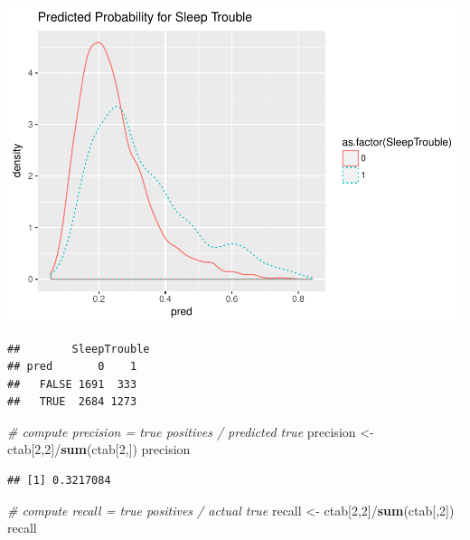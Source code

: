 \documentclass[]{article}
\newenvironment{Shaded}{\begin{snugshade}}{\end{snugshade}}
\newcommand{\KeywordTok}[1]{\textcolor[rgb]{0.13,0.29,0.53}{\textbf{{#1}}}}
\newcommand{\DataTypeTok}[1]{\textcolor[rgb]{0.13,0.29,0.53}{{#1}}}
\newcommand{\DecValTok}[1]{\textcolor[rgb]{0.00,0.00,0.81}{{#1}}}
\newcommand{\FloatTok}[1]{\textcolor[rgb]{0.00,0.00,0.81}{{#1}}}
\newcommand{\StringTok}[1]{\textcolor[rgb]{0.31,0.60,0.02}{{#1}}}
\newcommand{\CommentTok}[1]{\textcolor[rgb]{0.56,0.35,0.01}{\textit{{#1}}}}
\newcommand{\NormalTok}[1]{{#1}}
\begin{document}
\includegraphics{Hmwk7AnswerKey_files/figure-latex/unnamed-chunk-7-1.pdf}

\begin{Shaded}
\end{Shaded}

\begin{verbatim}
##        SleepTrouble
## pred       0    1
##   FALSE 1691  333
##   TRUE  2684 1273
\end{verbatim}

\begin{Shaded}
\begin{Highlighting}[]
\CommentTok{# compute precision = true positives / predicted true}
\NormalTok{precision <-}\StringTok{ }\NormalTok{ctab[}\DecValTok{2}\NormalTok{,}\DecValTok{2}\NormalTok{]/}\KeywordTok{sum}\NormalTok{(ctab[}\DecValTok{2}\NormalTok{,])}
\NormalTok{precision}
\end{Highlighting}
\end{Shaded}

\begin{verbatim}
## [1] 0.3217084
\end{verbatim}

\begin{Shaded}
\begin{Highlighting}[]
\CommentTok{# compute recall = true positives / actual true}
\NormalTok{recall <-}\StringTok{ }\NormalTok{ctab[}\DecValTok{2}\NormalTok{,}\DecValTok{2}\NormalTok{]/}\KeywordTok{sum}\NormalTok{(ctab[,}\DecValTok{2}\NormalTok{])}
\NormalTok{recall}
\end{Highlighting}
\end{Shaded}
\end{document}

